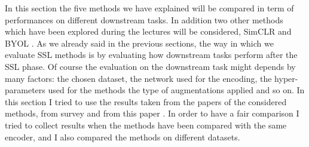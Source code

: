In this section the five methods we have explained will be compared in term of performances on different downstream tasks. In addition two other methods which have been explored during the lectures will be considered, SimCLR \cite{chen2020simple} and BYOL \cite{grill2020bootstrap}. As we already said in the previous sections, the way in which we evaluate SSL methods is by evaluating how downstream tasks perform after the SSL phase. Of course the evaluation on the downstream task might depends by many factors: the chosen dataset, the network used for the encoding, the hyper-parameters used for the methods the type of augmentations applied and so on. In this section I tried to use the results taken from the papers of the considered methods, from survey \cite{technologies9010002} and from this paper \cite{ericsson2021well}. In order to have a fair comparison I tried to collect results when the methods have been compared with the same encoder, and I also compared the methods on different datasets.

